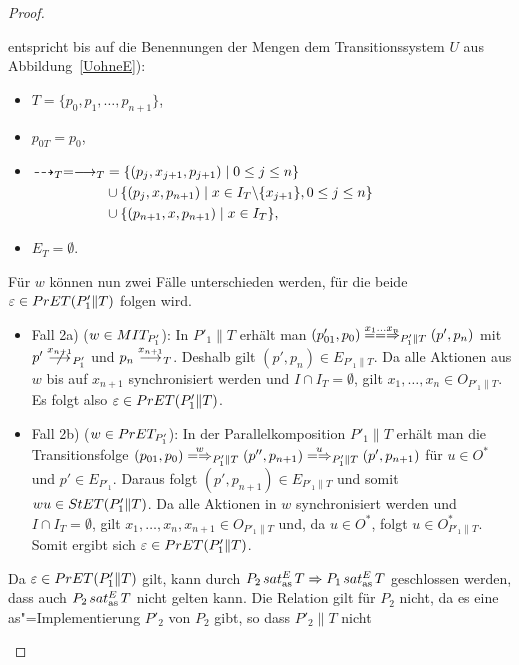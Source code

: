 \begin{proof}
\begin{itemize}
      entspricht bis auf die Benennungen der Mengen dem Transitionssystem $U$
      aus Abbildung~\ref{UohneE}):
      \begin{itemize}
        \item $T=\{p_0,p_1,\dots ,p_{n+1}\}$,
        \item $p_{0T}=p_0$,
        \item $\begin{aligned}[t]
            \may _T = \must _T&=\{(p_j,x_{j+1},p_{j+1})\mid  0\leq j\leq n\}\\
            &\cup\{(p_j,x,p_{n+1})\mid  x\in I_T\backslash\{x_{j+1}\}, 0\leq
            j\leq n\}\\
            &\cup\{(p_{n+1},x,p_{n+1})\mid  x\in I_T\},
        \end{aligned}$
        \item $E_T=\emptyset$.
      \end{itemize}
      Für $w$ können nun zwei Fälle unterschieden werden, für die beide
      $\varepsilon\in PrET (P'_1\|T)$ folgen wird.
      \begin{itemize}
        \item Fall 2a) ($w\in MIT _{P'_1}$): In $P'_1\|T$ erhält man
          $(p'_{01},p_0) \lweakmay[x_1\dots x_n]_{P'_1\|T} (p',p_n)$ mit $p'
          \nmust[x_{n+1}]_{P'_1}$ und $p_n\must[x_{n+1}]_T$. Deshalb gilt
          $(p',p_n)\in E_{P'_1\|T}$. Da alle Aktionen aus $w$ bis auf $x_{n+1}$
          synchronisiert werden und $I\cap I_T=\emptyset$, gilt $x_1,\dots ,
          x_n\in O_{P'_1\|T}$. Es folgt also $\varepsilon\in PrET (P'_1\|T)$.
        \item Fall 2b) ($w\in PrET _{P'_1}$): In der Parallelkomposition
          $P'_1\|T$ erhält man die Transitionsfolge $(p_{01},p_0)
          \weakmay[w]_{P'_1\|T} (p'',p_{n+1}) \weakmay[u]_{P'_1\|T}
          (p',p_{n+1})$ für $u\in O^*$ und $p'\in E_{P'_1}$. Daraus folgt
          $(p',p_{n+1})\in E_{P'_1\|T}$ und somit $wu\in StET (P'_1\|T)$. Da
          alle Aktionen in $w$ synchronisiert werden und $I\cap I_T =
          \emptyset$, gilt $x_1,\dots , x_n, x_{n+1}\in O_{P'_1\|T}$ und, da
          $u\in O^*$, folgt $u\in O^*_{P'_1\|T}$. Somit ergibt sich
          $\varepsilon \in PrET (P'_1\|T)$.
      \end{itemize}
      Da $\varepsilon\in PrET (P'_1\|T)$ gilt, kann durch $P_2\hspace{0.05cm}sat_\mathrm{as}^E\hspace{0.05cm} T
      \Rightarrow P_1\hspace{0.05cm}sat_\mathrm{as}^E\hspace{0.05cm} T$ geschlossen werden, dass auch $P_2\hspace{0.05cm}sat_\mathrm{as}^E\hspace{0.05cm} T$
      nicht gelten kann. Die Relation gilt für $P_2$ nicht, da es eine
      as"=Implementierung $P'_2$ von $P_2$ gibt, so dass $P'_2\|T$ nicht

\end{itemize}
\end{proof}
